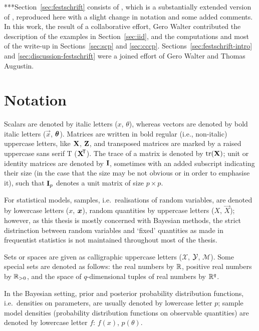 ***Section~\ref{sec:festschrift} consists of \textcite{Walter2009b},
which is a substantially extended version of \textcite{Walter2010a},
reproduced here with a slight change in notation and some added comments.
In this work, the result of a collaborative effort, Gero Walter contributed 
the description of the examples in Section~\ref{sec:iid},
and the computations and most of the write-up in Sections~\ref{sec:scp} and \ref{sec:cccp}.
Sections~\ref{sec:festschrift-intro} and \ref{sec:discussion-festschrift} were a joined effort
of Gero Walter and Thomas Augustin.


\section{Notation}
\label{sec:notation}

Scalars are denoted by italic letters ($x$, $\theta$),
whereas vectors are denoted by bold italic letters ($\vec{x}$, $\boldsymbol{\theta}$).
Matrices are written in bold regular (i.e., non-italic) uppercase letters, like $\mathbf{X}$, $\mathbf{Z}$,
and transposed matrices are marked by a raised uppercase sans serif T ($\mathbf{X}^{{\mbox{\!\scriptsize\textsf{T}}}}$).
The trace of a matrix is denoted by $\operatorname{tr}(\mathbf{X})$;
unit or identity matrices are denoted by $\mathbf{I}$,
sometimes with an added subscript indicating their size
(in the case that the size may be not obvious or in order to emphasise it),
such that $\mathbf{I}_p$ denotes a unit matrix of size $p \times p$.

For statistical models, samples, i.e.\ realisations of random variables,
are denoted by lowercase letters ($x$, ${\bm x}$),
random quantities by uppercase letters ($X$, $\vec{X}$);
however, as this thesis is mostly concerned with Bayesian methods,
the strict distrinction between random variables and `fixed' quantities as made in frequentist statistics
is not maintained throughout most of the thesis.

Sets or spaces are given as calligraphic uppercase letters ($\mathcal{X}$, $\mathcal{Y}$, $\mathcal{M}$).
Some special sets are denoted as follows:
the real numbers by $\mathbb{R}$, positive real numbers by $\mathbb{R}_{>0}$,
and the space of $q$-dimensional tuples of real numbers by $\mathbb{R}^q$.

In the Bayesian setting, prior and posterior probability distribution functions, i.e.\ densities on parameters,
are usually denoted by lowercase letter $p$;
sample model densities (probability distribution functions on observable quantities)
are denoted by lowercase letter $f$:
$f(x)$, $p(\theta)$.

